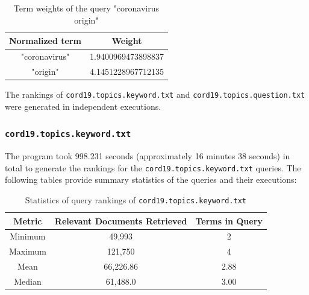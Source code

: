 \documentclass[11pt]{article}
\begin{document}
\begin{table}[!ht]
    \caption{Term weights of the query "coronavirus origin"}
    \begin{center}

        \begin{tabular}{| c | c |}
        \hline
        \textbf{Normalized term} & \textbf{Weight}
        \\ \hline
        "coronavirus" & 1.9400969473898837
        \\ \hline
        "origin" & 4.1451228967712135
        \\ \hline
        \end{tabular}

    \end{center}

\end{table}

The rankings of \texttt{cord19.topics.keyword.txt} and \texttt{cord19.topics.question.txt} were generated in independent executions.

\subsubsection{\texttt{cord19.topics.keyword.txt}}
The program took 998.231 seconds (approximately 16 minutes 38 seconds) in total to generate the rankings for the \texttt{cord19.topics.keyword.txt} queries. The following tables provide summary statistics of the queries and their executions:


\begin{table}[!ht]
    \caption{Statistics of query rankings of \texttt{cord19.topics.keyword.txt}}
    \begin{center}

        \begin{tabular}{| c | c | c |}
        \hline
        \textbf{Metric} & \textbf{Relevant Documents Retrieved} & \textbf{Terms in Query}
        \\ \hline
        Minimum & 49,993 & 2
        \\ \hline
        Maximum & 121,750 & 4
        \\ \hline
        Mean & 66,226.86 & 2.88
        \\ \hline
        Median & 61,488.0 & 3.00
        \\ \hline
        \end{tabular}

    \end{center}

\end{table}
\end{document}
